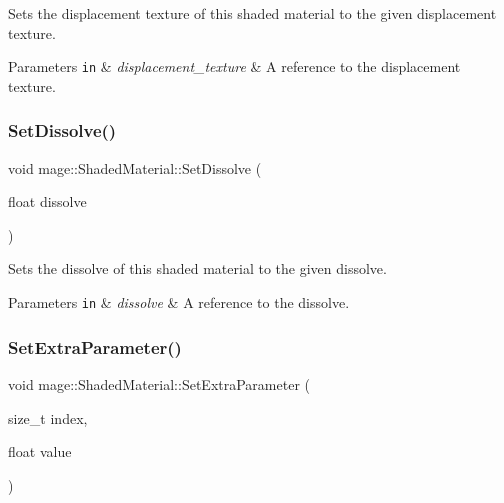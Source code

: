 Sets the displacement texture of this shaded material to the given displacement texture.


\begin{DoxyParams}[1]{Parameters}
\mbox{\tt in}  & {\em displacement\+\_\+texture} & A reference to the displacement texture. \\
\hline
\end{DoxyParams}
\hypertarget{structmage_1_1_shaded_material_a403f3e4e673d31fffdb387f518393453}{}\label{structmage_1_1_shaded_material_a403f3e4e673d31fffdb387f518393453} 
\subsubsection{\texorpdfstring{Set\+Dissolve()}{SetDissolve()}}
{\footnotesize\ttfamily void mage\+::\+Shaded\+Material\+::\+Set\+Dissolve (\begin{DoxyParamCaption}\item[{float}]{dissolve }\end{DoxyParamCaption})\hspace{0.3cm}{\ttfamily [noexcept]}}

Sets the dissolve of this shaded material to the given dissolve.


\begin{DoxyParams}[1]{Parameters}
\mbox{\tt in}  & {\em dissolve} & A reference to the dissolve. \\
\hline
\end{DoxyParams}
\hypertarget{structmage_1_1_shaded_material_acf33a3820b485d0402d132275ed4d515}{}\label{structmage_1_1_shaded_material_acf33a3820b485d0402d132275ed4d515} 
\subsubsection{\texorpdfstring{Set\+Extra\+Parameter()}{SetExtraParameter()}}
{\footnotesize\ttfamily void mage\+::\+Shaded\+Material\+::\+Set\+Extra\+Parameter (\begin{DoxyParamCaption}\item[{size\+\_\+t}]{index,  }\item[{float}]{value }\end{DoxyParamCaption})\hspace{0.3cm}{\ttfamily [noexcept]}}


